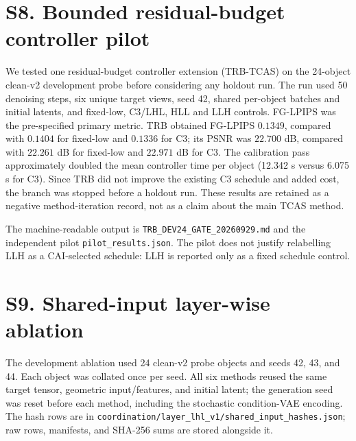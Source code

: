 \documentclass[10pt]{article}
\begin{document}
\section{S8. Bounded residual-budget controller pilot}

We tested one residual-budget controller extension (TRB-TCAS) on the
24-object clean-v2 development probe before considering any holdout run. The
run used 50 denoising steps, six unique target views, seed 42, shared
per-object batches and initial latents, and fixed-low, C3/LHL, HLL and LLH
controls. FG-LPIPS was the pre-specified primary metric. TRB obtained
FG-LPIPS $0.1349$, compared with $0.1404$ for fixed-low and $0.1336$ for C3;
its PSNR was $22.700$ dB, compared with $22.261$ dB for fixed-low and
$22.971$ dB for C3. The calibration pass approximately doubled the mean
controller time per object (12.342 s versus 6.075 s for C3). Since TRB did
not improve the existing C3 schedule and added cost, the branch was stopped
before a holdout run. These results are retained as a negative method-iteration
record, not as a claim about the main TCAS method.

The machine-readable output is
\texttt{TRB\_DEV24\_GATE\_20260929.md} and the independent pilot
\texttt{pilot\_results.json}. The pilot does not justify relabelling LLH as a
CAI-selected schedule: LLH is reported only as a fixed schedule control.

\section{S9. Shared-input layer-wise ablation}

The development ablation used 24 clean-v2 probe objects and seeds 42, 43, and
44. Each object was collated once per seed. All six methods reused the same
target tensor, geometric input/features, and initial latent; the generation
seed was reset before each method, including the stochastic condition-VAE
encoding. The hash rows are in
\texttt{coordination/layer\_lhl\_v1/shared\_input\_hashes.json}; raw rows,
manifests, and SHA-256 sums are stored alongside it.
\end{document}
